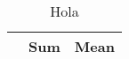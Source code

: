 \begin{table}[htbp]\centering
\def\sym#1{\ifmmode^{#1}\else\(^{#1}\)\fi}
\caption{Hola\label{Table1}}
\begin{tabular}{l*{1}{cc}}
\toprule
                    &         Sum&        Mean\\
\midrule
\bottomrule
\end{tabular}
\end{table}
